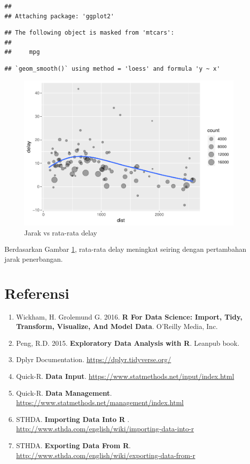 \documentclass[]{book}
\providecommand{\tightlist}{%
  \setlength{\itemsep}{0pt}\setlength{\parskip}{0pt}}
\begin{document}
\begin{verbatim}
## 
## Attaching package: 'ggplot2'
\end{verbatim}

\begin{verbatim}
## The following object is masked from 'mtcars':
## 
##     mpg
\end{verbatim}

\begin{verbatim}
## `geom_smooth()` using method = 'loess' and formula 'y ~ x'
\end{verbatim}

\begin{figure}

{\centering \includegraphics[width=0.7\linewidth]{EnvStat_files/figure-latex/distvsave-1} 

}

\caption{Jarak vs rata-rata delay}\label{fig:distvsave}
\end{figure}

Berdasarkan Gambar \ref{fig:distvsave}, rata-rata delay meningkat
seiring dengan pertambahan jarak penerbangan.

\section{Referensi}\label{referensi-2}

\begin{enumerate}
\def\labelenumi{\arabic{enumi}.}
\tightlist
\item
  Wickham, H. Grolemund G. 2016. \textbf{R For Data Science: Import,
  Tidy, Transform, Visualize, And Model Data}. O'Reilly Media, Inc.
\item
  Peng, R.D. 2015. \textbf{Exploratory Data Analysis with R}. Leanpub
  book.
\item
  Dplyr Documentation. \url{https://dplyr.tidyverse.org/}
\item
  Quick-R. \textbf{Data Input}.
  \url{https://www.statmethods.net/input/index.html}
\item
  Quick-R. \textbf{Data Management}.
  \url{https://www.statmethods.net/management/index.html}
\item
  STHDA. \textbf{Importing Data Into R }.
  \url{http://www.sthda.com/english/wiki/importing-data-into-r}
\item
  STHDA. \textbf{Exporting Data From R}.
  \url{http://www.sthda.com/english/wiki/exporting-data-from-r}
\end{enumerate}
\end{document}
